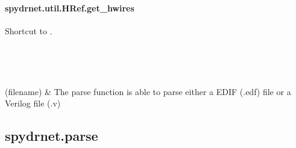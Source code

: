 \documentclass[letterpaper,10pt,english,openany,oneside]{sphinxmanual}
\begin{document}
\paragraph{spydrnet.util.HRef.get\_hwires}
\label{\detokenize{reference/classes/generated/spydrnet.util.HRef.get_hwires:spydrnet-util-href-get-hwires}}\label{\detokenize{reference/classes/generated/spydrnet.util.HRef.get_hwires::doc}}

\begin{fulllineitems}
\label{\detokenize{reference/classes/generated/spydrnet.util.HRef.get_hwires:spydrnet.util.HRef.get_hwires}}
Shortcut to {\hyperref[\detokenize{reference/classes/generated/spydrnet.get_hwires:spydrnet.get_hwires}]{}}.

\end{fulllineitems}



\begin{savenotes}\sphinxatlongtablestart\begin{longtable}[c]{}
\hline

\endfirsthead

%
{}\\
\hline

\endhead

\hline
{}\\
\endfoot

\endlastfoot

{\hyperref[\detokenize{reference/classes/generated/spydrnet.parse:spydrnet.parse}]{}}(filename)
&
The parse function is able to parse either a EDIF (.edf) file or a Verilog file (.v)
\\
\hline
\end{longtable}\sphinxatlongtableend\end{savenotes}


\subsection{spydrnet.parse}
\label{\detokenize{reference/classes/generated/spydrnet.parse:spydrnet-parse}}\label{\detokenize{reference/classes/generated/spydrnet.parse::doc}}
\end{document}

